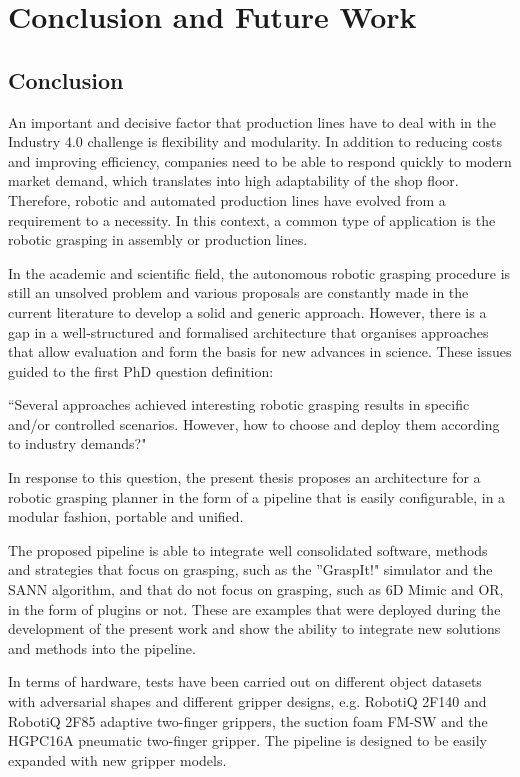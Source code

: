 \chapter{Conclusion and Future Work}
\label{cap6:conclusion}

\section{Conclusion}

An important and decisive factor that production lines have to deal with in the Industry 4.0 challenge is flexibility and modularity. In addition to reducing costs and improving efficiency, companies need to be able to respond quickly to modern market demand, which translates into high adaptability of the shop floor. Therefore, robotic and automated production lines have evolved from a requirement to a necessity. In this context, a common type of application is the robotic grasping in assembly or production lines. 

In the academic and scientific field, the autonomous robotic grasping procedure is still an unsolved problem and various proposals are constantly made in the current literature to develop a solid and generic approach. However, there is a gap in a well-structured and formalised architecture that organises approaches that allow evaluation and form the basis for new advances in science. These issues guided to the first PhD question definition:

\begin{flushright}
	``Several approaches achieved interesting robotic grasping results in specific and/or controlled scenarios. However, how to choose and deploy them according to industry demands?"
\end{flushright}

In response to this question, the present thesis proposes an architecture for a robotic grasping planner in the form of a pipeline that is easily configurable, in a modular fashion, portable and unified.

The proposed pipeline is able to integrate well consolidated software, methods and strategies that focus on grasping, such as the ''GraspIt!" simulator and the \ac{SANN} algorithm, and that do not focus on grasping, such as 6D Mimic and OR, in the form of plugins or not. These are examples that were deployed during the development of the present work and show the ability to integrate new solutions and methods into the pipeline.

In terms of hardware, tests have been carried out on different object datasets with adversarial shapes and different gripper designs, e.g. RobotiQ 2F140 and RobotiQ 2F85 adaptive two-finger grippers, the suction foam FM-SW and the HGPC16A pneumatic two-finger gripper. The pipeline is designed to be easily expanded with new gripper models.

